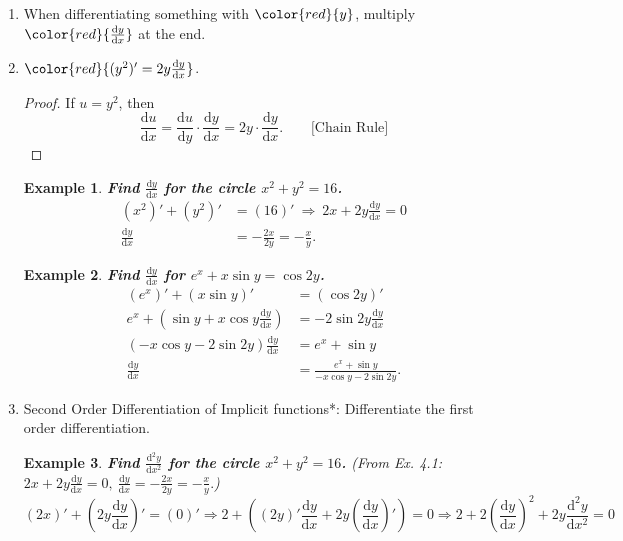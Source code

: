 \documentclass[12pt, a4paper]{article}
\newtheorem{example}{Example}[subsection]
\newtheorem{proof}{Proof}[subsection]
\begin{document}
\begin{enumerate}
    \item When differentiating something with $\color{red}{y}$, multiply $\color{red}{\frac{\mathrm{d}y}{\mathrm{d}x}}$ at the end. 
    \item $\color{red}{(y^2)'=2y\frac{\mathrm{d}y}{\mathrm{d}x}}$.
    \begin{proof}
        If $u=y^2$, then 
        $$\frac{\mathrm{d}u}{\mathrm{d}x}=\frac{\mathrm{d}u}{\mathrm{d}y}\cdot\frac{\mathrm{d}y}{\mathrm{d}x}=2y\cdot\frac{\mathrm{d}y}{\mathrm{d}x}.\ \ \ \ \ \ \ \ \ \text{[Chain Rule]}$$
    \end{proof}
    \begin{example}
        \textbf{Find $\frac{\mathrm{d}y}{\mathrm{d}x}$ for the circle $x^2+y^2=16$.}
        $$\begin{aligned}
            (x^2)'+(y^2)'&=(16)'\ \Rightarrow\ 2x+2y\frac{\mathrm{d}y}{\mathrm{d}x}=0\\
            \frac{\mathrm{d}y}{\mathrm{d}x}&=-\frac{2x}{2y}=-\frac{x}{y}.
        \end{aligned}$$
    \end{example}
    \begin{example}
        \textbf{Find $\frac{\mathrm{d}y}{\mathrm{d}x}$ for $e^x+x\sin y=\cos 2y$.}
        $$\begin{aligned}
            (e^x)'+(x\sin y)'&=(\cos 2y)'\\
            e^x+\left(\sin y+x\cos y\frac{\mathrm{d}y}{\mathrm{d}x}\right)&=-2\sin 2y\frac{\mathrm{d}y}{\mathrm{d}x}\\
            (-x\cos y-2\sin 2y)\frac{\mathrm{d}y}{\mathrm{d}x}&=e^x+\sin y\\
            \frac{\mathrm{d}y}{\mathrm{d}x}&=\frac{e^x+\sin y}{-x\cos y-2\sin 2y}.
        \end{aligned}$$
    \end{example}
    \item Second Order Differentiation of Implicit functions*: Differentiate the first order differentiation.
    \begin{example}
        \textbf{Find $\frac{\mathrm{d}^2y}{\mathrm{d}x^2}$ for the circle $x^2+y^2=16$.} (From Ex. 4.1: $2x+2y\frac{\mathrm{d}y}{\mathrm{d}x}=0,\ \frac{\mathrm{d}y}{\mathrm{d}x}=-\frac{2x}{2y}=-\frac{x}{y}.$)
        $$(2x)'+\left(2y\frac{\mathrm{d}y}{\mathrm{d}x}\right)'=(0)'\Rightarrow2+\left((2y)'\frac{\mathrm{d}y}{\mathrm{d}x}+2y\left(\frac{\mathrm{d}y}{\mathrm{d}x}\right)'\right)=0\Rightarrow2+2\left(\frac{\mathrm{d}y}{\mathrm{d}x}\right)^2+2y\frac{\mathrm{d}^2y}{\mathrm{d}x^2}=0$$

\end{example}
\end{enumerate}
\end{document}
